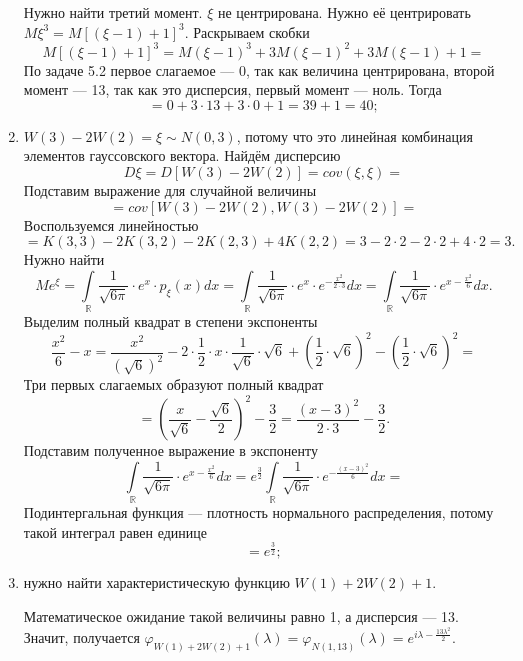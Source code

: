 \begin{enumerate}[label=\alph*)]
  Нужно найти третий момент.
  $ \xi $ не центрирована.
  Нужно её центрировать $M \xi^3 = M \left[ \left( \xi - 1 \right) + 1 \right]^3$.
  Раскрываем скобки
  $$M \left[ \left( \xi - 1 \right) + 1 \right]^3 =
    M \left( \xi - 1 \right)^3 + 3M \left( \xi - 1 \right)^2 + 3M \left( \xi - 1 \right) + 1 =$$
  По задаче 5.2 первое слагаемое --- 0, так как величина центрирована, второй момент --- 13,
  так как это дисперсия, первый момент --- ноль.
  Тогда
  $$= 0 + 3 \cdot 13 + 3 \cdot 0 + 1 = 39 + 1 = 40;$$
  \item $W \left( 3 \right) - 2W \left( 2 \right) = \xi \sim N \left( 0, 3 \right) $,
  потому что это линейная комбинация элементов гауссовского вектора.
  Найдём дисперсию
  $$D \xi =
    D \left[ W \left( 3 \right) - 2W \left( 2 \right) \right] =
    cov \left( \xi, \xi \right) =$$
  Подставим выражение для случайной величины
  $$= cov \left[
      W \left( 3 \right) - 2W \left( 2 \right), W \left( 3 \right) - 2W \left( 2 \right) \right] =$$
  Воспользуемся линейностью
  $$= K \left( 3, 3 \right) - 2K \left( 3, 2 \right) - 2K \left( 2, 3 \right) +
    4K \left( 2, 2 \right) =
    3 - 2 \cdot 2 - 2 \cdot 2 + 4 \cdot 2 =
    3.$$
  Нужно найти
  $$Me^{ \xi } =
    \int \limits_{ \mathbb{R}}
      \frac{1}{ \sqrt{6 \pi }} \cdot e^x \cdot p_{ \xi } \left( x \right) dx =
    \int \limits_{ \mathbb{R}}
      \frac{1}{ \sqrt{6 \pi }} \cdot e^x \cdot e^{- \frac{x^2}{2 \cdot 3}} dx =
    \int \limits_{ \mathbb{R}} \frac{1}{ \sqrt{6 \pi }} \cdot e^{x - \frac{x^2}{6}} dx.$$
  Выделим полный квадрат в степени экспоненты
  $$ \frac{x^2}{6} - x =
    \frac{x^2}{ \left( \sqrt{6} \right)^2} -
    2 \cdot \frac{1}{2} \cdot x \cdot \frac{1}{ \sqrt{6}} \cdot \sqrt{6} +
    \left( \frac{1}{2} \cdot \sqrt{6} \right)^2 - \left( \frac{1}{2} \cdot \sqrt{6} \right)^2 =$$
  Три первых слагаемых образуют полный квадрат
  $$= \left( \frac{x}{ \sqrt{6}} - \frac{ \sqrt{6}}{2} \right)^2 - \frac{3}{2} =
    \frac{ \left( x - 3 \right)^2}{2 \cdot 3} - \frac{3}{2}.$$
  Подставим полученное выражение в экспоненту
  $$ \int \limits_{ \mathbb{R}} \frac{1}{ \sqrt{6 \pi }} \cdot e^{x - \frac{x^2}{6}} dx =
    e^{ \frac{3}{2}}
    \int \limits_{ \mathbb{R}}
      \frac{1}{ \sqrt{6 \pi }} \cdot e^{- \frac{ \left( x - 3 \right)^2}{6}} dx =$$
  Подинтергальная функция --- плотность нормального распределения,
  потому такой интеграл равен единице
  $$= e^{ \frac{3}{2}};$$
  \item нужно найти характеристическую функцию $W \left( 1 \right) + 2W \left( 2 \right) + 1$.

  Математическое ожидание такой величины равно 1, а дисперсия --- 13.
  Значит, получается
  $ \varphi_{W \left( 1 \right) + 2W \left( 2 \right) + 1} \left( \lambda \right) =
    \varphi_{N \left( 1, 13 \right) } \left( \lambda \right) =
    e^{i \lambda - \frac{13 \lambda^2}{2}}$.
\end{enumerate}

